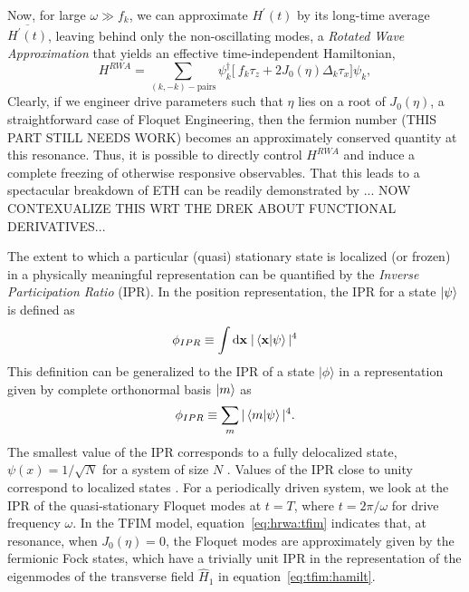 \documentclass[%
reprint,
superscriptaddress,
amsmath,amssymb,
aps,
prb,
]{revtex4-2}
\begin{document}
	Now, for large $\omega \gg f_k$, we can approximate $H^\prime(t)$ by its long-time average $\overline{H^\prime(t)}$, leaving behind only the non-oscillating modes, a  \textit{Rotated Wave Approximation} that yields an effective time-independent Hamiltonian,
	\begin{equation}
		\label{eq:hrwa:tfim}
		H^{RWA} = \sum_{(k,-k)-\mbox{pairs}} \psi^\dagger_k
		\bigg[\ f_k\tau_z + 2 J_0(\eta) \Delta_k\tau_x \bigg]\psi_k,
	\end{equation}
	Clearly, if we engineer drive parameters such that $\eta$ lies on a root of $J_0(\eta)$, a straightforward case of Floquet Engineering, then the fermion number (THIS PART STILL NEEDS WORK) becomes an approximately conserved quantity at this resonance. Thus, it is possible to directly control $H^{RWA}$ and induce a complete freezing of otherwise responsive observables. That this leads to a spectacular breakdown of ETH can be readily demonstrated by ... NOW CONTEXUALIZE THIS WRT THE DREK ABOUT FUNCTIONAL DERIVATIVES...
	
	The extent to which a particular (quasi) stationary state is localized (or frozen) in a physically meaningful representation can be quantified by the \emph{Inverse Participation Ratio} (IPR). In the position representation, the IPR for a state $\ket{\psi}$  \cite{mukherjee_modulation-assisted_2015,lin_many-body_2018,murphy_generalized_2011, torres-herrera_self-averaging_2020} is defined as
	\begin{equation*}
		\phi_{IPR}\equiv \int \mathrm{d}\mathbf{x}\;\vert\ip{\mathbf{x}}{\psi}\vert^4
	\end{equation*}
	This definition can be generalized to the IPR of a state $|\phi\rangle$ in a representation given by complete orthonormal basis $\ket{m}$ as 
	\begin{equation}
	\label{eq:ipr:defn}
	\phi_{IPR} \equiv \sum_m\vert\ip{m}{\psi}\vert^4.
	\end{equation}
	The smallest value of the IPR corresponds to a fully delocalized state, $\psi(x)=1/\sqrt{N}$ for a system of size $N$ \cite{torres-herrera_self-averaging_2020,trivedi_can_2005}. Values of the IPR close to unity correspond to localized states \cite{misguich_inverse_2016}. For a periodically driven system, we look at the IPR of the quasi-stationary Floquet modes at $t=T$, where $t=2\pi/\omega$ for drive frequency $\omega$. In the TFIM model, equation~\ref{eq:hrwa:tfim} indicates that, at resonance, when $J_0(\eta)=0$, the Floquet modes are approximately given by the fermionic Fock states, which have a trivially unit IPR in the representation of the eigenmodes of the transverse field $\hat{H}_1$ in equation~\ref{eq:tfim:hamilt}.
		
\end{document}
